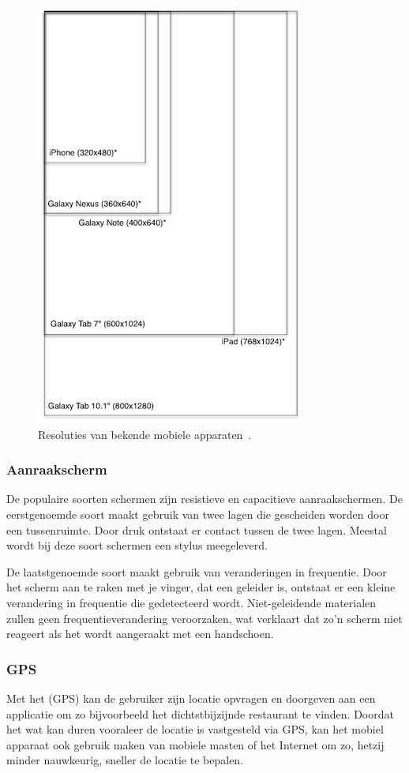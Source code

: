\begin{figure}
  \centering
  \includegraphics[height=0.8\textwidth]{figuren/mobile-devices-resolutions.png}
  \caption{Resoluties van bekende mobiele apparaten~\cite{Wolfermann2012}.}
  \label{fig:resoluties}
\end{figure}

\subsubsection{Aanraakscherm}
De populaire soorten schermen zijn resistieve en capacitieve aanraakschermen. De eerstgenoemde soort maakt gebruik van twee lagen die gescheiden worden door een tussenruimte. Door druk ontstaat er contact tussen de twee lagen. Meestal wordt bij deze soort schermen een stylus meegeleverd. 

De laatstgenoemde soort maakt gebruik van veranderingen in frequentie. Door het scherm aan te raken met je vinger, dat een geleider is, ontstaat er een kleine verandering in frequentie die gedetecteerd wordt. Niet-geleidende materialen zullen geen frequentieverandering veroorzaken, wat verklaart dat zo'n scherm niet reageert als het wordt aangeraakt met een handschoen.

\subsubsection{GPS}
Met het  (GPS) kan de gebruiker zijn locatie opvragen en doorgeven aan een applicatie om zo bijvoorbeeld het dichtstbijzijnde restaurant te vinden. 
Doordat het wat kan duren vooraleer de locatie is vastgesteld via GPS, kan het mobiel apparaat ook gebruik maken van mobiele masten of het Internet om zo, hetzij minder nauwkeurig, sneller de locatie te bepalen.

